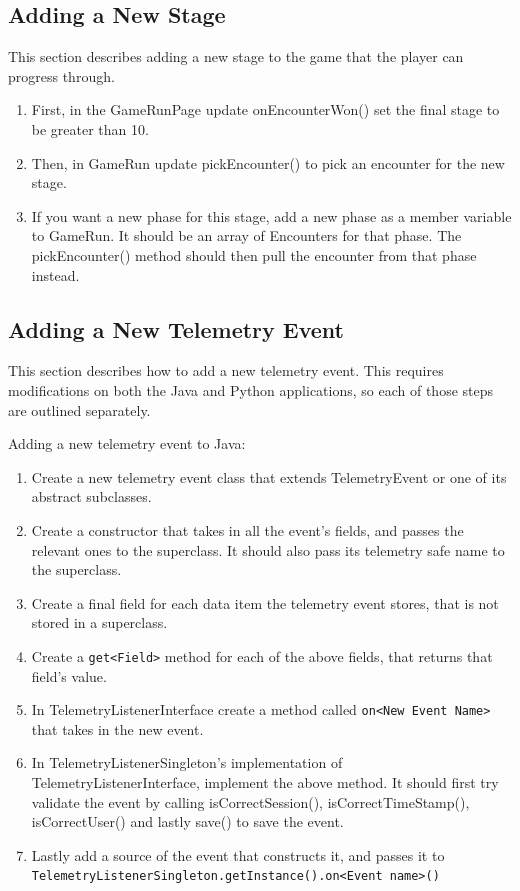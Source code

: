 \documentclass[11pt]{article}
\begin{document}
\subsection{Adding a New Stage}
This section describes adding a new stage to the game that the player can progress through.

\begin{enumerate}
  \item First, in the GameRunPage update onEncounterWon() set the final stage to be greater than 10.
  \item Then, in GameRun update pickEncounter() to pick an encounter for the new stage.
  \item If you want a new phase for this stage, add a new phase as a member variable to GameRun. It should be an array of Encounters for that phase. The pickEncounter() method should then pull the encounter from that phase instead. 
\end{enumerate}

\subsection{Adding a New Telemetry Event}
This section describes how to add a new telemetry event. This requires modifications on both the Java and Python applications, so each of those steps are outlined separately. 

Adding a new telemetry event to Java:
\begin{enumerate}
  \item Create a new telemetry event class that extends TelemetryEvent or one of its abstract subclasses. 
  \item Create a constructor that takes in all the event's fields, and passes the relevant ones to the superclass. It should also pass its telemetry safe name to the superclass.
  \item Create a final field for each data item the telemetry event stores, that is not stored in a superclass. 
  \item Create a \verb|get<Field>| method for each of the above fields, that returns that field's value. 
  \item In TelemetryListenerInterface create a method called \verb|on<New Event Name>| that takes in the new event.
  \item In TelemetryListenerSingleton's implementation of TelemetryListenerInterface, implement the above method. It should first try validate the event by calling isCorrectSession(), isCorrectTimeStamp(), isCorrectUser() and lastly save() to save the event.
  \item Lastly add a source of the event that constructs it, and passes it to \\\verb|TelemetryListenerSingleton.getInstance().on<Event name>()|
\end{enumerate}
\end{document}
